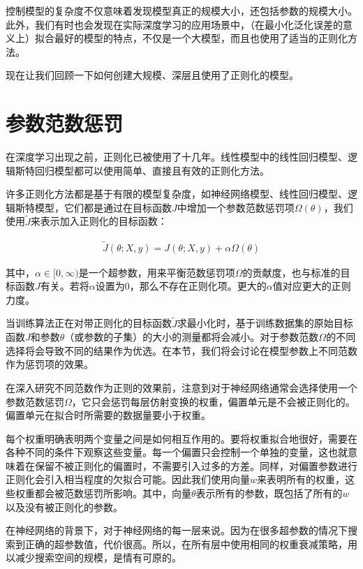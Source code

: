 控制模型的复杂度不仅意味着发现模型真正的规模大小，还包括参数的规模大小。此外，我们有时也会发现在实际深度学习的应用场景中，（在最小化泛化误差的意义上）拟合最好的模型的特点，不仅是一个大模型，而且也使用了适当的正则化方法。

现在让我们回顾一下如何创建大规模、深层且使用了正则化的模型。

\section{参数范数惩罚}
在深度学习出现之前，正则化已被使用了十几年。线性模型中的线性回归模型、逻辑斯特回归模型都可以使用简单、直接且有效的正则化方法。

许多正则化方法都是基于有限的模型复杂度，如神经网络模型、线性回归模型、逻辑斯特模型，它们都是通过在目标函数$J$中增加一个参数范数惩罚项$\Omega (\theta)$，我们使用$\widetilde{J}$来表示加入正则化的目标函数：

$$
\begin{aligned}
	\widetilde{J} (\theta; X, y) = J(\theta; X, y) + \alpha \Omega (\theta)
\end{aligned}
$$

其中，$\alpha \in [0, \infty)$是一个超参数，用来平衡范数惩罚项$\Omega$的贡献度，也与标准的目标函数$J$有关。若将$\alpha$设置为$0$，那么不存在正则化项。更大的$\alpha$值对应更大的正则力度。

当训练算法正在对带正则化的目标函数$\widetilde{J}$求最小化时，基于训练数据集的原始目标函数$J$和参数$\theta$（或参数的子集）的大小的测量都将会减小。对于参数范数$\Omega$的不同选择将会导致不同的结果作为优选。在本节，我们将会讨论在模型参数上不同范数作为惩罚项的效果。

在深入研究不同范数作为正则的效果前，注意到对于神经网络通常会选择使用一个参数范数惩罚$\Omega$，它只会惩罚每层仿射变换的权重，偏置单元是不会被正则化的。偏置单元在拟合时所需要的数据量要小于权重。

每个权重明确表明两个变量之间是如何相互作用的。要将权重拟合地很好，需要在各种不同的条件下观察这些变量。每一个偏置只会控制一个单独的变量，这也就意味着在保留不被正则化的偏置时，不需要引入过多的方差。同样，对偏置参数进行正则化会引入相当程度的欠拟合可能。因此我们使用向量$w$来表明所有的权重，这些权重都会被范数惩罚所影响。其中，向量$\theta$表示所有的参数，既包括了所有的$w$以及没有被正则化的参数。

在神经网络的背景下，对于神经网络的每一层来说。因为在很多超参数的情况下搜索到正确的超参数值，代价很高。所以，在所有层中使用相同的权重衰减策略，用以减少搜索空间的规模，是情有可原的。

